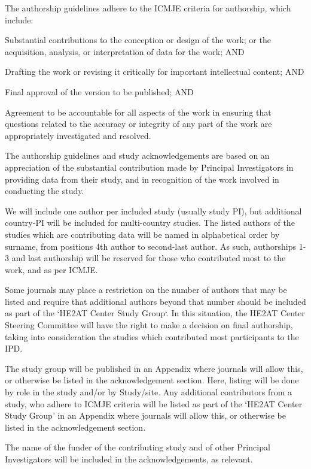 \documentclass[12pt,letterpaper]{article}
\begin{document}
The authorship guidelines adhere to the ICMJE criteria for authorship, which include:

Substantial contributions to the conception or design of the work; or the acquisition, analysis, or interpretation of data for the work; AND

Drafting the work or revising it critically for important intellectual content; AND

Final approval of the version to be published; AND

Agreement to be accountable for all aspects of the work in ensuring that questions related to the accuracy or integrity of any part of the work are appropriately investigated and resolved.

The authorship guidelines and study acknowledgements are based on an appreciation of the substantial contribution made by Principal Investigators in providing data from their study, and in recognition of the work involved in conducting the study.

We will include one author per included study (usually study PI), but additional country-PI will be included for multi-country studies. The listed authors of the studies which are contributing data will be named in alphabetical order by surname, from positions 4th author to second-last author. As such, authorships 1-3 and last authorship will be reserved for those who contributed most to the work, and as per ICMJE.

Some journals may place a restriction on the number of authors that may be listed and require that additional authors beyond that number should be included as part of the ‘HE2AT Center Study Group‘. In this situation, the HE2AT Center Steering Committee will have the right to make a decision on final authorship, taking into consideration the studies which contributed most participants to the IPD.

The study group will be published in an Appendix where journals will allow this, or otherwise be listed in the acknowledgement section. Here, listing will be done by role in the study and/or by Study/site. Any additional contributors from a study, who adhere to ICMJE criteria will be listed as part of the ‘HE2AT Center Study Group’ in an Appendix where journals will allow this, or otherwise be listed in the acknowledgement section.

The name of the funder of the contributing study and of other Principal Investigators will be included in the acknowledgements, as relevant.
\end{document}
